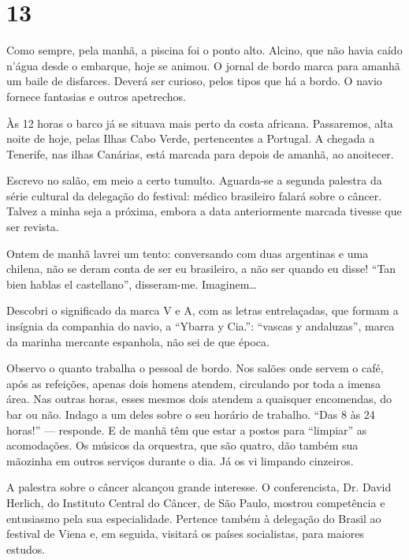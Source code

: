 \section*{13 \adfflatleafright {}}

Como sempre, pela manhã, a piscina foi o ponto alto. Alcino, que não havia caído n’água desde o embarque, hoje se animou. O jornal de bordo marca para amanhã um baile de disfarces. Deverá ser curioso, pelos tipos que há a bordo. O navio fornece fantasias e outros apetrechos.

Às 12 horas o barco já se situava mais perto da costa africana. Passaremos, alta noite de hoje, pelas Ilhas Cabo Verde, pertencentes a Portugal. A chegada a Tenerife, nas ilhas Canárias, está marcada para depois de amanhã, ao anoitecer.

Escrevo no salão, em meio a certo tumulto. Aguarda-se a segunda palestra da série cultural da delegação do festival: médico brasileiro falará sobre o câncer. Talvez a minha seja a próxima, embora a data anteriormente marcada tivesse que ser revista.

Ontem de manhã lavrei um tento: conversando com duas argentinas e uma chilena, não se deram conta de ser eu brasileiro, a não ser quando eu disse! ``Tan bien hablas el castellano'', disseram-me. Imaginem\ldots

Descobri o significado da marca V e A, com as letras entrelaçadas, que formam a insígnia da companhia do navio, a ``Ybarra y Cia.'': ``vascas y andaluzas'', marca da marinha mercante espanhola, não sei de que época.

Observo o quanto trabalha o pessoal de bordo. Nos salões onde servem o café, após as refeições, apenas dois homens atendem, circulando por toda a imensa área. Nas outras horas, esses mesmos dois atendem a quaisquer encomendas, do bar ou não. Indago a um deles sobre o seu horário de trabalho. ``Das 8 às 24 horas!'' --- responde. E de manhã têm que estar a postos para ``limpiar'' as acomodações. Os músicos da orquestra, que são quatro, dão também sua mãozinha em outros serviços durante o dia. Já os vi limpando cinzeiros.

A palestra sobre o câncer alcançou grande interesse. O conferencista, Dr. David Herlich, do Instituto Central do Câncer, de São Paulo, mostrou competência e entusiasmo pela sua especialidade. Pertence também à delegação do Brasil ao festival de Viena e, em seguida, visitará os países socialistas, para maiores estudos.

